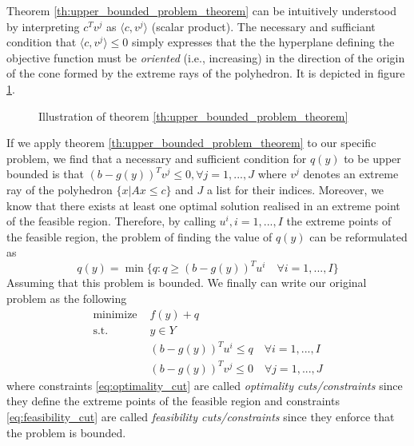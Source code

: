 Theorem \ref{th:upper_bounded_problem_theorem} can be intuitively understood by interpreting $c^Tv^j$ as $\langle c, v^j\rangle$ (scalar product). The necessary and sufficiant condition that $\langle c, v^j\rangle\le 0$ simply expresses that the the hyperplane defining the objective function must be \textit{oriented} (i.e., increasing) in the direction of the origin of the cone formed by the extreme rays of the polyhedron. It is depicted in figure \ref{fig:upper_bounded_problem}.

\begin{figure}[h!]
    \centering
    \caption{Illustration of theorem \ref{th:upper_bounded_problem_theorem}}
    \label{fig:upper_bounded_problem}
\end{figure}

If we apply theorem \ref{th:upper_bounded_problem_theorem} to our specific problem, we find that a necessary and sufficient condition for $q(y)$ to be upper bounded is that $(b-g(y))^Tv^j\le 0, \forall j=1,...,J$ where $v^j$ denotes an extreme ray of the polyhedron $\{x|Ax\le c\}$ and $J$ a list for their indices. Moreover, we know that there exists at least one optimal solution realised in an extreme point of the feasible region. Therefore, by calling $u^i, i=1,...,I$ the extreme points of the feasible region, the problem of finding the value of $q(y)$ can be reformulated as \[ q(y) = \min\{ q : q \ge (b-g(y))^Tu^i\quad\forall i=1,...,I \} \] Assuming that this problem is bounded. We finally can write our original problem as the following
\begin{align}
    \textrm{minimize } & f(y) + q\\
    \textrm{s.t. } & y\in Y\\
    & (b-g(y))^Tu^i \le q\quad\forall i=1,...,I \label{eq:optimality_cut}\\
    & (b-g(y))^Tv^j \le 0\quad\forall j=1,...,J \label{eq:feasibility_cut}
\end{align} where constraints \ref{eq:optimality_cut} are called \textit{optimality cuts/constraints} since they define the extreme points of the feasible region and constraints \ref{eq:feasibility_cut} are called \textit{feasibility cuts/constraints} since they enforce that the problem is bounded. 

